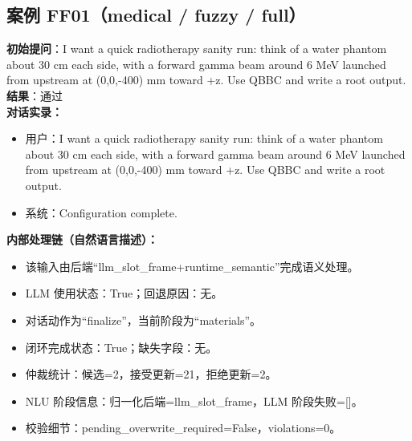 \documentclass[11pt]{ctexart}
\begin{document}
\subsection{案例 FF01（medical / fuzzy / full）}
\textbf{初始提问}：I want a quick radiotherapy sanity run: think of a water phantom about 30 cm each side, with a forward gamma beam around 6 MeV launched from upstream at (0,0,-400) mm toward +z. Use QBBC and write a root output.\\
\textbf{结果}：通过\\
\textbf{对话实录：}
\begin{itemize}
\item 用户：I want a quick radiotherapy sanity run: think of a water phantom about 30 cm each side, with a forward gamma beam around 6 MeV launched from upstream at (0,0,-400) mm toward +z. Use QBBC and write a root output.
\item 系统：Configuration complete.
\end{itemize}
\textbf{内部处理链（自然语言描述）：}
\begin{itemize}
\item 该输入由后端“llm\_slot\_frame+runtime\_semantic”完成语义处理。
\item LLM 使用状态：True；回退原因：无。
\item 对话动作为“finalize”，当前阶段为“materials”。
\item 闭环完成状态：True；缺失字段：无。
\item 仲裁统计：候选=2，接受更新=21，拒绝更新=2。
\item NLU 阶段信息：归一化后端=llm\_slot\_frame，LLM 阶段失败=[]。
\item 校验细节：pending\_overwrite\_required=False，violations=0。
\end{itemize}
\end{document}
